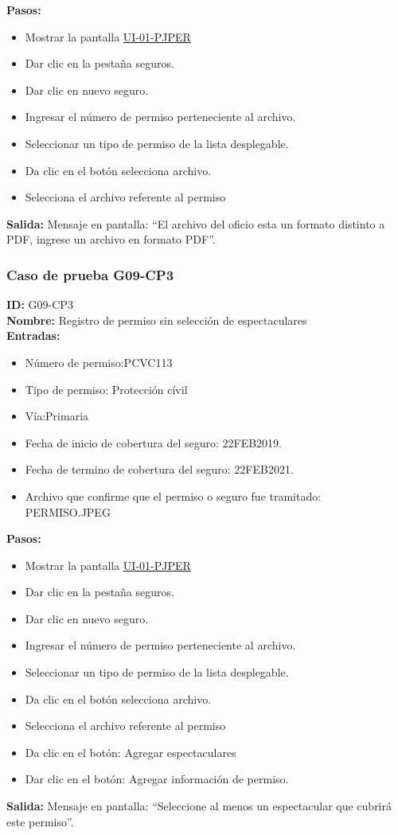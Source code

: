 \textbf{Pasos:}
\begin{itemize}
    \item Mostrar la pantalla \hyperlink{IU:UI-01-PJPER}{UI-01-PJPER}
    \item Dar clic en la pestaña seguros.
    \item Dar clic en nuevo seguro.
    \item Ingresar el número de permiso perteneciente al archivo.
    \item Seleccionar un tipo de permiso de la lista desplegable.
    \item Da clic en el botón selecciona archivo.
    \item Selecciona el archivo referente al permiso
\end{itemize}
\textbf{Salida:}
Mensaje en pantalla: ``El archivo del oficio esta un formato distinto a PDF, ingrese un archivo en formato PDF''.

\subsubsection{Caso de prueba G09-CP3}
\textbf{ID:} G09-CP3\\
\textbf{Nombre:} Registro de permiso sin selección de espectaculares\\
\textbf{Entradas:}
\begin{itemize}
    \item Número de permiso:PCVC113
    \item Tipo de permiso: Protección cívil
    \item Vía:Primaria 
	\item Fecha de inicio de cobertura del seguro: 22FEB2019.
	\item Fecha de termino de cobertura del seguro: 22FEB2021.
	\item Archivo que confirme que el permiso o seguro fue tramitado: PERMISO.JPEG
\end{itemize}

\textbf{Pasos:}
\begin{itemize}
    \item Mostrar la pantalla \hyperlink{IU:UI-01-PJPER}{UI-01-PJPER}
    \item Dar clic en la pestaña seguros.
    \item Dar clic en nuevo seguro.
    \item Ingresar el número de permiso perteneciente al archivo.
    \item Seleccionar un tipo de permiso de la lista desplegable.
    \item Da clic en el botón selecciona archivo.
    \item Selecciona el archivo referente al permiso
    \item Da clic en el botón: Agregar espectaculares
    \item Dar clic en el botón: Agregar información de permiso.
\end{itemize}
\textbf{Salida:}
Mensaje en pantalla: ``Seleccione al menos un espectacular que cubrirá este permiso''.

